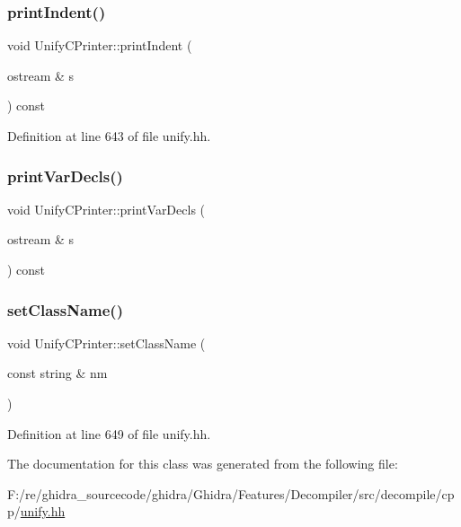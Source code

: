 \subsubsection{\texorpdfstring{printIndent()}{printIndent()}}
{\footnotesize\ttfamily void Unify\+C\+Printer\+::print\+Indent (\begin{DoxyParamCaption}\item[{ostream \&}]{s }\end{DoxyParamCaption}) const\hspace{0.3cm}{\ttfamily [inline]}}



Definition at line 643 of file unify.\+hh.

\mbox{\label{class_unify_c_printer_ad816ef381ccbaf0b61c6e09f29ba9871}} 
\subsubsection{\texorpdfstring{printVarDecls()}{printVarDecls()}}
{\footnotesize\ttfamily void Unify\+C\+Printer\+::print\+Var\+Decls (\begin{DoxyParamCaption}\item[{ostream \&}]{s }\end{DoxyParamCaption}) const}

\mbox{\label{class_unify_c_printer_a8ec5199aa1c272ec6f0b14f2606637b0}} 
\subsubsection{\texorpdfstring{setClassName()}{setClassName()}}
{\footnotesize\ttfamily void Unify\+C\+Printer\+::set\+Class\+Name (\begin{DoxyParamCaption}\item[{const string \&}]{nm }\end{DoxyParamCaption})\hspace{0.3cm}{\ttfamily [inline]}}



Definition at line 649 of file unify.\+hh.



The documentation for this class was generated from the following file\+:\begin{DoxyCompactItemize}
\item 
F\+:/re/ghidra\+\_\+sourcecode/ghidra/\+Ghidra/\+Features/\+Decompiler/src/decompile/cpp/\mbox{\hyperlink{unify_8hh}{unify.\+hh}}\end{DoxyCompactItemize}
